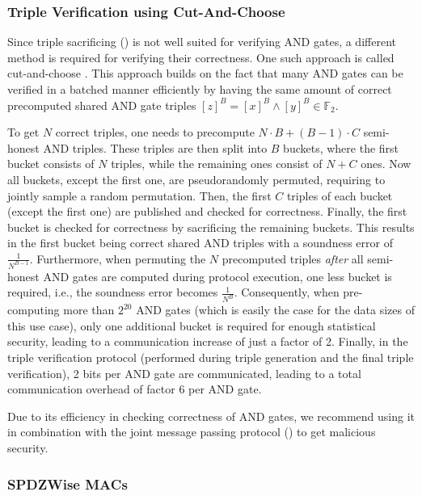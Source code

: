 \documentclass[a4paper,11pt,
]{article}
\newcommand{\F}{\ensuremath{\mathbb{F}}\xspace}
\newcommand{\sharedB}[1]{\ensuremath{[{#1}]^B}}
\begin{document}
\subsubsection{Triple Verification using Cut-And-Choose} \label{sec::cutandchoose}

Since triple sacrificing () is not well suited for verifying AND gates, a different method is required for verifying their correctness. One such approach is called cut-and-choose \cite{DBLP:conf/sp/ArakiBFLLNOWW17}. This approach builds on the fact that many AND gates can be verified in a batched manner efficiently by having the same amount of correct precomputed shared AND gate triples $\sharedB{z} = \sharedB{x} \wedge \sharedB{y} \in \F_2$.

To get $N$ correct triples, one needs to precompute $N\cdot B + (B-1)\cdot C$ semi-honest AND triples. These triples are then split into $B$ buckets, where the first bucket consists of $N$ triples, while the remaining ones consist of $N+C$ ones. Now all buckets, except the first one, are pseudorandomly permuted, requiring to jointly sample a random permutation. Then, the first $C$ triples of each bucket (except the first one) are published and checked for correctness. Finally, the first bucket is checked for correctness by sacrificing the remaining buckets. This results in the first bucket being correct shared AND triples with a soundness error of $\frac{1}{N^{B-1}}$. Furthermore, when permuting the $N$ precomputed triples \textit{after} all semi-honest AND gates are computed during protocol execution, one less bucket is required, i.e., the soundness error becomes $\frac{1}{N^B}$. Consequently, when pre-computing more than $2^{20}$ AND gates (which is easily the case for the data sizes of this use case), only one additional bucket is required for enough statistical security, leading to a communication increase of just a factor of 2. Finally, in the triple verification protocol (performed during triple generation and the final triple verification), 2 bits per AND gate are communicated, leading to a total communication overhead of factor 6 per AND gate.

Due to its efficiency in checking correctness of AND gates, we recommend using it in combination with the joint message passing protocol () to get malicious security.

\subsubsection{SPDZWise MACs} \label{sec::spdzwise}
\end{document}
